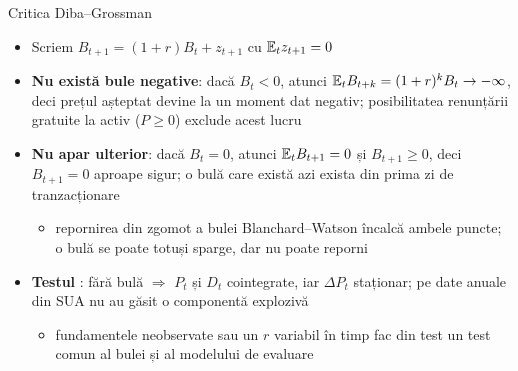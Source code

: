\begin{frame}{Critica Diba--Grossman}
\itemsize{\small}
\begin{itemize}
    \item Scriem $B_{t+1} = (1 + r)B_t + z_{t+1}$ cu $\mathbb{E}_t z_{t+1} = 0$ 
    \item \textbf{Nu există bule negative}: dacă $B_t < 0$, atunci $\mathbb{E}_t B_{t+k} = (1 + r)^k B_t \to -\infty$, deci prețul așteptat devine la un moment dat negativ; posibilitatea renunțării gratuite la activ ($P \ge 0$) exclude acest lucru
    \item \textbf{Nu apar ulterior}: dacă $B_t = 0$, atunci $\mathbb{E}_t B_{t+1} = 0$ și $B_{t+1} \ge 0$, deci $B_{t+1} = 0$ aproape sigur; o bulă care există azi exista din prima zi de tranzacționare
    \begin{itemize}
        \item repornirea din zgomot a bulei Blanchard--Watson încalcă ambele puncte; o bulă se poate totuși sparge, dar nu poate reporni
    \end{itemize}
    \item \textbf{Testul} : fără bulă $\Rightarrow$ $P_t$ și $D_t$ cointegrate, iar $\Delta P_t$ staționar; pe date anuale din SUA nu au găsit o componentă explozivă
    \begin{itemize}
        \item fundamentele neobservate sau un $r$ variabil în timp fac din test un test comun al bulei și al modelului de evaluare 
    \end{itemize}
\end{itemize}
\end{frame}

